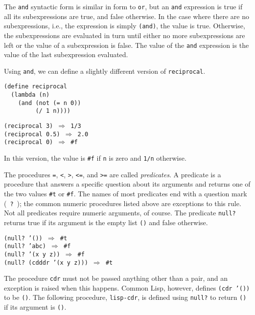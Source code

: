 The \label{start_s108}\texttt{and} syntactic form is similar in form to \texttt{or}, but an
\texttt{and} expression is true if all its subexpressions are true, and
false otherwise.
In the case where there are no subexpressions, i.e., the expression is
simply \texttt{(and)}, the value is true.
Otherwise, the subexpressions are evaluated in turn until either
no more subexpressions are left or the value of a subexpression is
false.
The value of the \texttt{and} expression
is the value of the last subexpression evaluated.


Using \texttt{and}, we can define a slightly different version of
\label{start_s109}\texttt{reciprocal}.


\begin{alltt}
(define reciprocal
  (lambda (n)
    (and (not (= n 0))
         (/ 1 n))))

(reciprocal 3) \(\Rightarrow\) 1/3
(reciprocal 0.5) \(\Rightarrow\) 2.0
(reciprocal 0) \(\Rightarrow\) \#{}f
\end{alltt}


In this version, the value is \texttt{\#{}f} if \texttt{n} is zero and \texttt{1/n} otherwise.


The procedures \texttt{=}, \texttt{\textless{}}, \texttt{\textgreater{}}, \texttt{\textless{}=}, and \texttt{\textgreater{}=} are
called \label{start_s110}\textit{predicates}.
A predicate is a procedure that answers a specific question about its
arguments and returns one of the two values \texttt{\#{}t} or \texttt{\#{}f}.
The names of most predicates end with a
\label{start_s111}\label{start_s112}question mark ( \texttt{?} ); the
common numeric procedures listed above are exceptions to this
rule.
Not all predicates require numeric arguments, of course.
The predicate \label{start_s113}\texttt{null?} returns true if its argument is the empty
list \texttt{()} and false otherwise.


\begin{alltt}
(null? '()) \(\Rightarrow\) \#{}t
(null? 'abc) \(\Rightarrow\) \#{}f
(null? '(x y z)) \(\Rightarrow\) \#{}f
(null? (cdddr '(x y z))) \(\Rightarrow\) \#{}t
\end{alltt}


The procedure \label{start_s114}\texttt{cdr} must not be passed anything other than a pair,
and an exception is raised when this happens.
Common Lisp, however, defines \texttt{(cdr '())} to be \texttt{()}.
The following procedure, \label{start_s115}\texttt{lisp-cdr}, is 
defined using \texttt{null?} to return
\texttt{()} if its argument is \texttt{()}.


